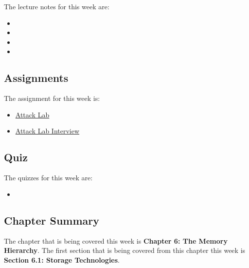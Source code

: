 \noindent The lecture notes for this week are:

\begin{itemize}
    \item {}
    \item {}
    \item {}
    \item {}
\end{itemize}

\subsection{Assignments}

The assignment for this week is:

\begin{itemize}
    \item \href{https://github.com/QuantumCompiler/CU/tree/main/CSPB%202400%20-%20Computer%20Systems/Assignments/Assignment%203%20-%20Attack%20Lab}{Attack Lab}
    \item \href{https://github.com/QuantumCompiler/CU/tree/main/CSPB%202400%20-%20Computer%20Systems/Assignments/Assignment%203%20-%20Attack%20Lab}{Attack Lab Interview}
\end{itemize}

\subsection{Quiz}

The quizzes for this week are:

\begin{itemize}
    \item {}
\end{itemize}

\subsection{Chapter Summary}

The chapter that is being covered this week is \textbf{Chapter 6: The Memory Hierarchy}. The first section that is being covered from this chapter this week is \textbf{Section 6.1: Storage Technologies}.

